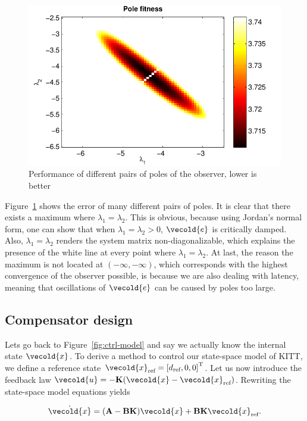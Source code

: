 \documentclass[11pt,titlepage]{report}
\let\vec\vecold
\newcommand{\vec}[1]{\mathbf{#1}}
\begin{document}
\begin{figure}[H]
	\begin{center}
		\includegraphics[width=.7\linewidth]{resource/pole-fitness.pdf}
	\end{center}
	\caption{Performance of different pairs of poles of the observer, lower is better}
	\label{fig:ctrl-poles}
\end{figure}

Figure~\ref{fig:ctrl-poles} shows the error of many different pairs of poles. It is clear that there exists a maximum where $\lambda_1=\lambda_2$. This is obvious, because using Jordan's normal form, one can show that when $\lambda_1 = \lambda_2>0$, 
$\vec{e}$ is critically damped. Also, $\lambda_1 = \lambda_2$ renders the system matrix non-diagonalizable, which explains the presence of the white line at every point where $\lambda_1=\lambda_2$. At last, the reason the maximum is not located at $(-\infty,-\infty)$, which corresponds with the highest convergence of the observer possible, is because we are also dealing with latency, meaning that oscillations of $\vec{e}$ can be caused by poles too large.  

\subsection{Compensator design}
Lets go back to Figure~\ref{fig:ctrl-model} and say we actually know the internal state $\vec{x}$. To derive a method to control our state-space model of KITT, we define a reference state $\vec{x}_{\text{ref}} = \tr{\left[ d_{\text{ref}},0,0 \right]}$. Let us now introduce the feedback law $\vec{u} = -\mat{K}(\vec{x}-\vec{x}_{\text{ref}})$. Rewriting the state-space model equations yields

\begin{equation} \label{eq:ctrl-comp}
	\dot{\vec{x}} = (\mat{A} - \mat{B} \mat{K}) \vec{x} + \mat{B} \mat{K} \vec{x}_{\text{ref}}.
\end{equation}
\end{document}
